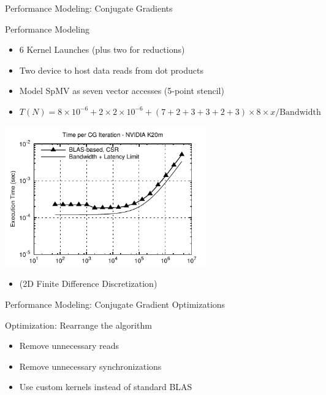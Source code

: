 \begin{frame}[fragile]{Performance Modeling: Conjugate Gradients}

 \begin{block}{Performance Modeling}
   \begin{itemize}
    \item 6 Kernel Launches (plus two for reductions)
    \item Two device to host data reads from dot products
    \item Model SpMV as seven vector accesses (5-point stencil)
    \item $T(N) = 8 \times 10^{-6} + 2 \times 2 \times 10^{-6} + (7+2+3+3+2+3) \times 8 \times x / \mathrm{Bandwidth}$
   \end{itemize}

 
 \begin{center}
  \vspace*{-0.2cm}
  \includegraphics[width=0.65\textwidth]{figures/cg-k20m-1}
 \end{center}

 \begin{itemize}
  \item   \vspace*{-0.5cm} {\small (2D Finite Difference Discretization)}
 \end{itemize}

 \end{block}
   
\end{frame}




\begin{frame}[fragile]{Performance Modeling: Conjugate Gradient Optimizations}

 \begin{block}{Optimization: Rearrange the algorithm}
   \begin{itemize}
   \item  Remove unnecessary reads 
   \item  Remove unnecessary synchronizations
   \item Use custom kernels instead of standard BLAS
  \end{itemize}
 \end{block}
   
\end{frame}


